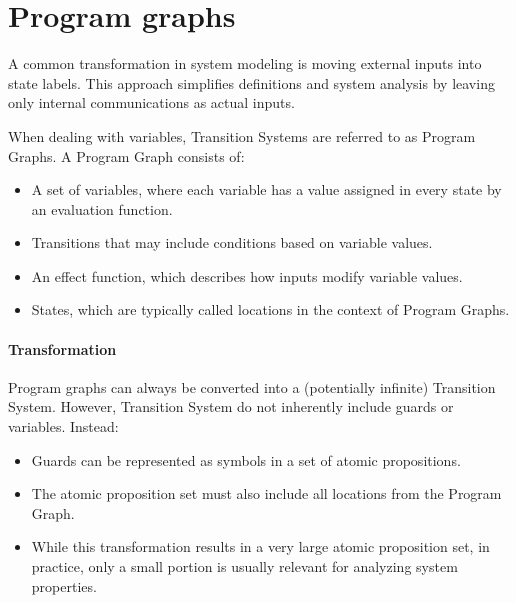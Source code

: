 \section{Program graphs}

A common transformation in system modeling is moving external inputs into state labels. 
This approach simplifies definitions and system analysis by leaving only internal communications as actual inputs.

When dealing with variables, Transition Systems are referred to as Program Graphs. 
A Program Graph consists of:
\begin{itemize}
    \item A set of variables, where each variable has a value assigned in every state by an evaluation function.
    \item Transitions that may include conditions based on variable values.
    \item An effect function, which describes how inputs modify variable values.
    \item States, which are typically called locations in the context of Program Graphs.
\end{itemize}

\paragraph*{Transformation}
Program graphs can always be converted into a (potentially infinite) Transition System.
However, Transition System do not inherently include guards or variables. 
Instead:
\begin{itemize}
    \item Guards can be represented as symbols in a set of atomic propositions.
    \item The atomic proposition set must also include all locations from the Program Graph.
    \item While this transformation results in a very large atomic proposition set, in practice, only a small portion is usually relevant for analyzing system properties.
\end{itemize}